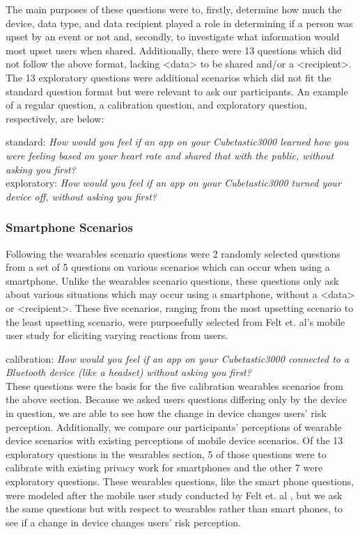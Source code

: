 \documentclass{acm_proc_article-sp}
\begin{document}
The main purposes of these questions were to, firstly, determine how much the device, data type, and data recipient played a role in determining if a person was upset by an event or not and, secondly, to investigate what information would most upset users when shared. Additionally, there were 13 questions which did not follow the above format, lacking <data> to be shared and/or a <recipient>.  The 13 exploratory questions were additional scenarios which did not fit the standard question format but were relevant to ask our participants. An example of a regular question, a calibration question, and exploratory question, respectively, are below:  

standard: \textit{How would you feel if an app on your Cubetastic3000 learned how you were feeling based on your heart rate and shared that with the public, without asking you first?}\\[-.5cm]

exploratory: \textit{How would you feel if an app on your Cubetastic3000 turned your device off, without asking you first?}\\[-.5cm]

\subsubsection{Smartphone Scenarios}
Following the wearables scenario questions were 2 randomly selected questions from a set of 5 questions on various scenarios which can occur when using a smartphone. Unlike the wearables scenario questions, these questions only ask about various situations which may occur using a smartphone, without a <data> or <recipient>. These five scenarios, ranging from the most upsetting scenario to the least upsetting scenario, were purposefully selected from Felt et. al's mobile user study \cite{Felt} for eliciting varying reactions from users. 

calibration: \textit{How would you feel if an app on your Cubetastic3000 connected to a Bluetooth device (like a headset) without asking you first?} \\[-.5cm]

These questions were the basis for the five calibration wearables scenarios from the above section. Because we asked users questions differing only by the device in question, we are able to see how the change in device changes users' risk perception. Additionally, we compare our participants' perceptions of wearable device scenarios with existing perceptions of mobile device scenarios. Of the 13 exploratory questions in the wearables section, 5 of those questions were to calibrate with existing privacy work for smartphones and the other 7  were exploratory questions. These wearables questions, like the smart phone questions, were modeled after the mobile user study conducted by Felt et. al \cite{Felt}, but we ask the same questions but with respect to wearables rather than smart phones, to see if a change in device changes users' risk perception.
\end{document}

